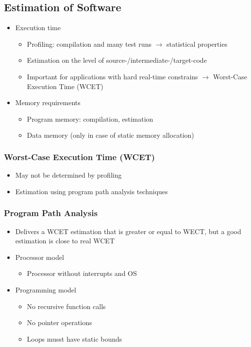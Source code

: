 \subsection{Estimation of Software}
\begin{itemize}
	\item Execution time
\begin{itemize}
	\item Profiling: compilation and many test runs $\rightarrow$ statistical properties
	\item Estimation on the level of source-/intermediate-/target-code
	\item Important for applications with hard real-time constrains $\rightarrow$ Worst-Case Execution Time (WCET)
\end{itemize}
	\item Memory requirements
\begin{itemize}
	\item Program memory: compilation, estimation
	\item Data memory (only in case of static memory allocation)
\end{itemize}
\end{itemize}

\subsubsection{Worst-Case Execution Time (WCET)}
\begin{itemize}
	\item May not be determined by profiling
	\item Estimation using program path analysis techniques
\end{itemize}

\subsubsection{Program Path Analysis}
\begin{itemize}
	\item Delivers a WCET estimation that is greater or equal to WECT, but a good estimation is close to real WCET
	\item Processor model
\begin{itemize}
	\item Processor without interrupts and OS
\end{itemize}
	\item Programming model
\begin{itemize}
	\item No recursive function calls
	\item No pointer operations
	\item Loops musst have static bounds
\end{itemize}
\end{itemize}

